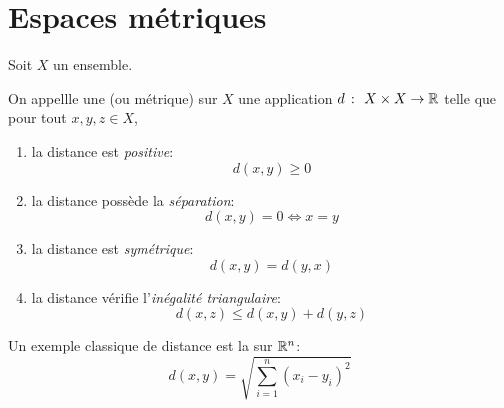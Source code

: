 \section{Espaces métriques}\label{sec:espaces-metriques}

Soit \(X\) un ensemble.

\begin{definition}
    On appellle une  (ou métrique) sur \(X\)
    une application \(d\ \colon\  X \times X \to \mathbb{R}\) telle que
    pour tout \(x, y, z \in X\),
    \begin{enumerate}[label=(\roman*)] %
        \item la distance est \emph{positive}:
        \begin{equation*}
            d(x, y) \geq 0
        \end{equation*}

        \item la distance possède la \emph{séparation}:
        \begin{equation*}
            d(x, y) = 0 \iff x = y
        \end{equation*}

        \item la distance est \emph{symétrique}:
        \begin{equation*}
            d(x, y) = d(y, x)
        \end{equation*}

        \item la distance vérifie l'\emph{inégalité triangulaire}:
        \begin{equation*}
            d(x, z) \leq d(x, y) + d(y, z)
        \end{equation*}
    \end{enumerate}
\end{definition}

\begin{example}
    Un exemple classique de distance est la  sur \(\mathbb{R}^n\):
    \begin{equation*}
        d(x, y) = \sqrt{\sum_{i=1}^n {(x_i - y_i)}^2}
    \end{equation*}
\end{example}

